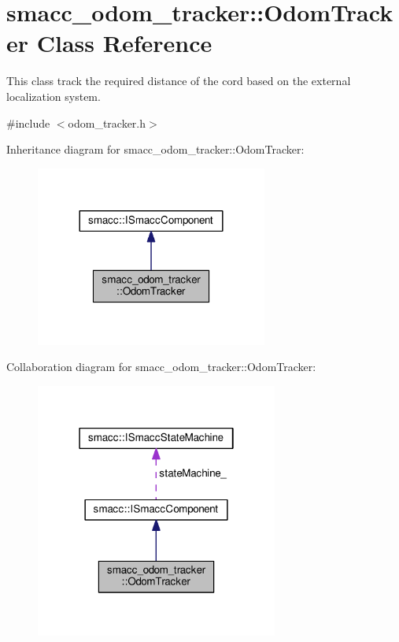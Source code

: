 \hypertarget{classsmacc__odom__tracker_1_1OdomTracker}{\section{smacc\-\_\-odom\-\_\-tracker\-:\-:Odom\-Tracker Class Reference}
\label{classsmacc__odom__tracker_1_1OdomTracker}
}


This class track the required distance of the cord based on the external localization system.  




{\ttfamily \#include $<$odom\-\_\-tracker.\-h$>$}



Inheritance diagram for smacc\-\_\-odom\-\_\-tracker\-:\-:Odom\-Tracker\-:
\nopagebreak
\begin{figure}[H]
\begin{center}
\leavevmode
\includegraphics[width=216pt]{classsmacc__odom__tracker_1_1OdomTracker__inherit__graph}
\end{center}
\end{figure}


Collaboration diagram for smacc\-\_\-odom\-\_\-tracker\-:\-:Odom\-Tracker\-:
\nopagebreak
\begin{figure}[H]
\begin{center}
\leavevmode
\includegraphics[width=226pt]{classsmacc__odom__tracker_1_1OdomTracker__coll__graph}
\end{center}
\end{figure}
